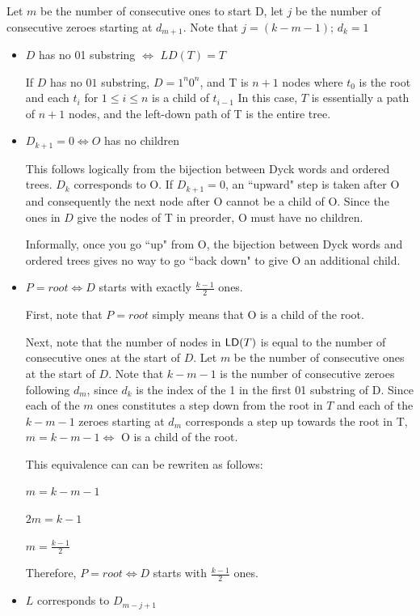 Let $m$ be the number of consecutive ones to start D, let $j$ be the number of consecutive zeroes starting at $d_{m+1}$.  Note that $j=(k-m-1)$; $d_{k}=1$
\begin{itemize}
    \item $D$ has no 01 substring $\iff$ $LD(T)=T$


	If $D$ has no $01$ substring, $D=1^n0^n$, and T is $n+1$ nodes where $t_0$ is the root and each $t_i$ for $1\le i \le n$ is a child of $t_{i-1}$  In this case, $T$ is essentially a path of $n+1$ nodes, and the left-down path of T is the entire tree.
    \item $D_{k+1} = 0 \iff O$ has no children

	This follows logically from the bijection between Dyck words and ordered trees.  $D_k$ corresponds to O.  If $D_{k+1}=0$, an ``upward" step is taken after O and consequently the next node after O cannot be a child of O.  Since the ones in $D$ give the nodes of T in preorder, O must have no children.

	Informally, once you go ``up" from O, the bijection between Dyck words and ordered trees gives no way to go ``back down" to give O an additional child.
    \item $P=root \iff D$ starts with exactly $\frac{k-1}{2}$ ones.

	First, note that $P=root$ simply means that O is a child of the root.

	Next, note that the number of nodes in $\mathsf{LD}{(T)}$ is equal to the number of consecutive ones at the start of $D$.  Let $m$ be the number of consecutive ones at the start of $D$.  Note that $k-m-1$ is the number of consecutive zeroes following $d_m$, since $d_k$ is the index of the 1 in the first 01 substring of D. Since each of the $m$ ones constitutes a step down from the root in $T$ and each of the $k-m-1$ zeroes starting at $d_m$ corresponds a step up towards the root in T, $m=k-m-1 \iff $ O is a child of the root. 

	This equivalence can can be rewriten as follows: 

	$m=k-m-1$

	$2m=k-1$

	$m=\frac{k-1}{2}$


	Therefore, $P=root \iff D$  starts with $\frac{k-1}{2}$ ones.

    \item $L$ corresponds to $D_{m-j+1}$

	
\end{itemize}
